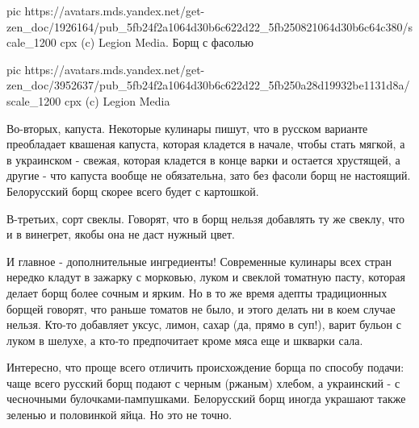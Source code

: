 \ifcmt
pic https://avatars.mds.yandex.net/get-zen_doc/1926164/pub_5fb24f2a1064d30b6c622d22_5fb250821064d30b6c64c380/scale_1200
cpx (c) Legion Media. Борщ с фасолью

pic https://avatars.mds.yandex.net/get-zen_doc/3952637/pub_5fb24f2a1064d30b6c622d22_5fb250a28d19932be1131d8a/scale_1200
cpx (c) Legion Media
\fi

Во-вторых, капуста. Некоторые кулинары пишут, что в русском варианте
преобладает квашеная капуста, которая кладется в начале, чтобы стать мягкой, а
в украинском - свежая, которая кладется в конце варки и остается хрустящей, а
другие - что капуста вообще не обязательна, зато без фасоли борщ не настоящий.
Белорусский борщ скорее всего будет с картошкой.

В-третьих, сорт свеклы. Говорят, что в борщ нельзя добавлять ту же свеклу, что
и в винегрет, якобы она не даст нужный цвет.

И главное - дополнительные ингредиенты! Современные кулинары всех стран нередко
кладут в зажарку с морковью, луком и свеклой томатную пасту, которая делает
борщ более сочным и ярким. Но в то же время адепты традиционных борщей говорят,
что раньше томатов не было, и этого делать ни в коем случае нельзя. Кто-то
добавляет уксус, лимон, сахар (да, прямо в суп!), варит бульон с луком в
шелухе, а кто-то предпочитает кроме мяса еще и шкварки сала.

Интересно, что проще всего отличить происхождение борща по способу подачи: чаще
всего русский борщ подают с черным (ржаным) хлебом, а украинский - с чесночными
булочками-пампушками. Белорусский борщ иногда украшают также зеленью и
половинкой яйца. Но это не точно.
